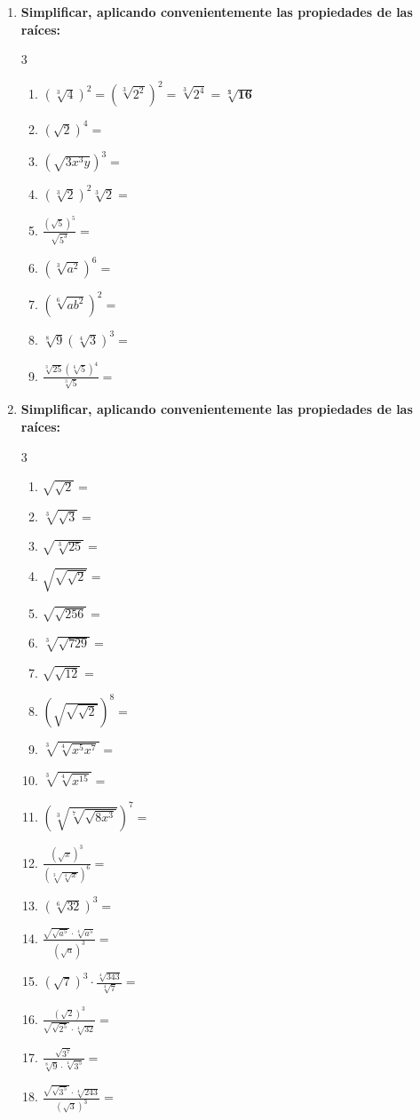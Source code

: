 \documentclass[a4paper,12pt]{article}
\begin{document}
\begin{enumerate}
    \item \textbf{Simplificar, aplicando convenientemente las propiedades de las raíces:}
    \begin{multicols}{3}
    \begin{enumerate}[label=\alph*)]
        \item $(\sqrt[3]{4})^2 = (\sqrt[3]{2^2})^2 = \sqrt[3]{2^4} = \mathbf{\sqrt[3]{16}}$
        \item $(\sqrt{2})^4 =$
        \item $(\sqrt{3x^3 y})^3 =$
        \item $(\sqrt[3]{2})^2 \sqrt[3]{2} =$
        \item $\frac{(\sqrt{5})^5}{\sqrt{5^3}} =$
        \item $(\sqrt[3]{a^2})^6 =$
        \item $(\sqrt[6]{a b^2})^2 =$
        \item $\sqrt[8]{9}(\sqrt[4]{3})^3 =$
        \item $\frac{\sqrt[3]{25}(\sqrt[6]{5})^4}{\sqrt[3]{5}} =$
    \end{enumerate}
    \end{multicols}

    \item \textbf{Simplificar, aplicando convenientemente las propiedades de las raíces:}
    \begin{multicols}{3}
    \begin{enumerate}[label=\alph*)]
        \item $\sqrt{\sqrt{2}} =$
        \item $\sqrt[3]{\sqrt{3}} =$
        \item $\sqrt{\sqrt[3]{25}} =$
        \item $\sqrt{\sqrt{\sqrt{2}}} =$
        \item $\sqrt{\sqrt{256}} =$
        \item $\sqrt[3]{\sqrt{729}} =$
        \item $\sqrt{\sqrt{12}} =$
        \item $(\sqrt{\sqrt{\sqrt{2}}})^8 =$
        \item $\sqrt[3]{\sqrt[4]{x^5 x^7}} =$
        \item $\sqrt[3]{\sqrt[4]{x^{15}}} =$
        \item $(\sqrt[3]{\sqrt[7]{\sqrt{8x^3}}})^7 =$
        \item $\frac{(\sqrt{x})^3}{(\sqrt[3]{\sqrt[4]{x}})^6} =$
        \item $(\sqrt[6]{32})^3 =$
        \item $\frac{\sqrt{\sqrt{a^5}}\cdot\sqrt[4]{a^5}}{(\sqrt{a})^3} =$
        \item $(\sqrt{7})^3 \cdot \frac{\sqrt[4]{343}}{\sqrt[4]{7}} =$
        \item $\frac{(\sqrt{2})^3}{\sqrt{\sqrt{2^5}}\cdot\sqrt[4]{32}} =$
        \item $\frac{\sqrt{3^7}}{\sqrt[8]{9}\cdot\sqrt[4]{3^5}} =$
        \item $\frac{\sqrt{\sqrt{3^5}}\cdot\sqrt[4]{243}}{(\sqrt{3})^3} =$
    \end{enumerate}
    \end{multicols}


\end{enumerate}
\end{document}
